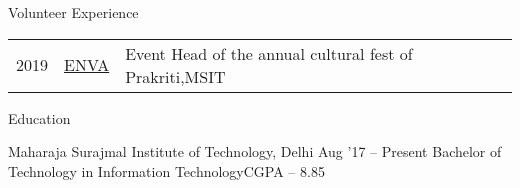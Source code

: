 \documentclass{resume} %
\begin{document}

\begin{rSection}{Volunteer Experience}
  \begin{tabular}{rll}
2019	    & {\href{http://www.msit.in/media/2019/03/20/report-on-enva.pdf}{ENVA}}  & Event Head of the annual cultural fest of Prakriti,MSIT\\
\end{tabular}
\end{rSection}


\begin{rSection}{Education}
  \begin{rEducationSection}{Maharaja Surajmal Institute of Technology, Delhi}
                           {Aug '17 -- Present}
                           {Bachelor of Technology in Information Technology\hspace{6cm}CGPA -- 8.85}
                           
                           
  \end{rEducationSection}
\end{rSection}
\end{document}
